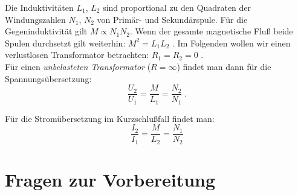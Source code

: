 Die Induktivitäten $L_1$, $L_2$ sind proportional zu den Quadraten der Windungszahlen $N_1$, $N_2$ von Primär- und Sekundärspule. Für die Gegeninduktivität gilt $M\propto N_1N_2$. Wenn der gesamte magnetische Fluß beide Spulen durchsetzt gilt weiterhin: $M^2 = L_1L_2$\; . Im Folgenden wollen wir einen verlustlosen Transformator betrachten: $R_1 = R_2 = 0$\; .\\
Für einen \textit{unbelasteten Transformator} ($R = \infty$) findet man dann für die Spannungsübersetzung:
\begin{equation} \label{eq:Spannungsuebersetzung}
\frac{U_2}{U_1} = \frac{M}{L_1} = \frac{N_2}{N_1}\; .
\end{equation}

\noindent
Für die Stromübersetzung im Kurzschlußfall findet man:
\begin{equation} \label{eq:Stromuebersetzung}
\frac{I_2}{I_1} = \frac{M}{L_2} = \frac{N_1}{N_2}
\end{equation}
\section{Fragen zur Vorbereitung}

